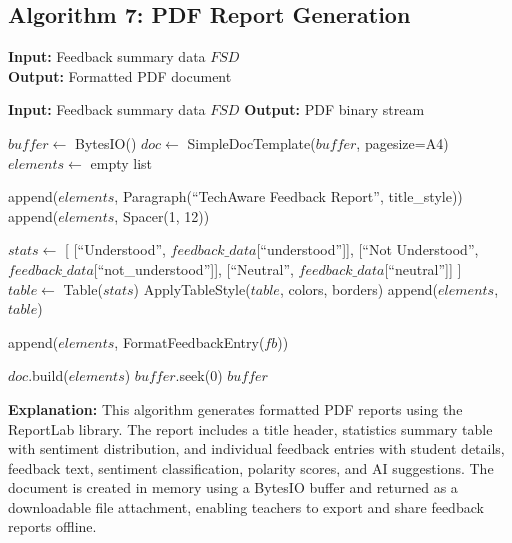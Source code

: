 \subsection{Algorithm 7: PDF Report Generation}

\textbf{Input:} Feedback summary data $FSD$ \\
\textbf{Output:} Formatted PDF document

\begin{algorithm}[H]
\caption{PDF Feedback Report Generation}
\begin{algorithmic}[1]

\State \textbf{Input:} Feedback summary data $FSD$
\State \textbf{Output:} PDF binary stream

    \State $buffer \gets$ BytesIO()
    \State $doc \gets$ SimpleDocTemplate($buffer$, pagesize=A4)
    \State $elements \gets$ empty list
    
    \State {}
    \State append($elements$, Paragraph(``TechAware Feedback Report'', title\_style))
    \State append($elements$, Spacer(1, 12))
    
    \State {}
    \State $stats \gets$ [
    \State \hspace{1em} [``Understood'', $feedback\_data$[``understood'']],
    \State \hspace{1em} [``Not Understood'', $feedback\_data$[``not\_understood'']],
    \State \hspace{1em} [``Neutral'', $feedback\_data$[``neutral'']]
    \State ]
    \State $table \gets$ Table($stats$)
    \State ApplyTableStyle($table$, colors, borders)
    \State append($elements$, $table$)
    
    \State {}
        \State append($elements$, FormatFeedbackEntry($fb$))
    \EndFor
    
    \State $doc$.build($elements$)
    \State $buffer$.seek(0)
    \State \Return $buffer$ 
\EndFunction

\end{algorithmic}
\end{algorithm}

\textbf{Explanation:}
This algorithm generates formatted PDF reports using the ReportLab library. The report includes a title header, statistics summary table with sentiment distribution, and individual feedback entries with student details, feedback text, sentiment classification, polarity scores, and AI suggestions. The document is created in memory using a BytesIO buffer and returned as a downloadable file attachment, enabling teachers to export and share feedback reports offline.



